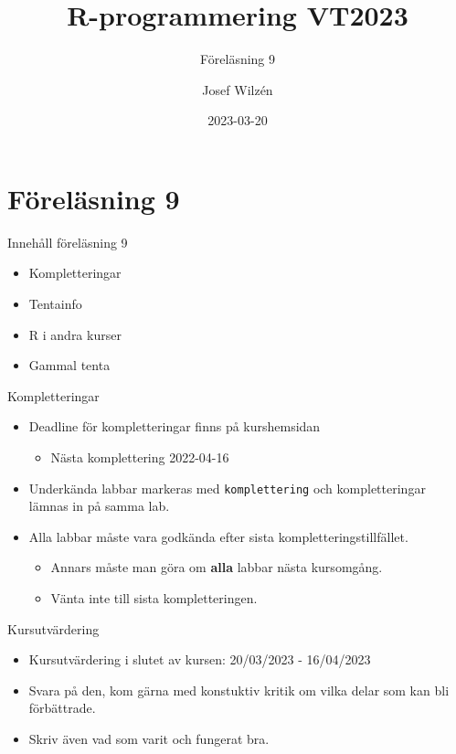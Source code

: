 \documentclass[
  11pt,
  ignorenonframetext,
  handout]{beamer}
\title{R-programmering VT2023}
\subtitle{Föreläsning 9}
\author{Josef Wilzén}
\date{2023-03-20}
\institute{Linköpings Universitet}
\providecommand{\tightlist}{%
  \setlength{\itemsep}{0pt}\setlength{\parskip}{0pt}}
\begin{document}
\frame{\titlepage}

\hypertarget{fuxf6reluxe4sning-9}{%
\section{Föreläsning 9}\label{fuxf6reluxe4sning-9}}


\begin{frame}{Innehåll föreläsning 9}
\protect\hypertarget{innehuxe5ll-fuxf6reluxe4sning-9}{}
\begin{itemize}
\tightlist
\item
  Kompletteringar
\item
  Tentainfo
\item
  R i andra kurser
\item
  Gammal tenta
\end{itemize}
\end{frame}


\begin{frame}[fragile]{Kompletteringar}
\protect\hypertarget{kompletteringar}{}
\begin{itemize}
\tightlist
\item
  Deadline för kompletteringar finns på kurshemsidan 

  \begin{itemize}
  \tightlist
  \item
    Nästa komplettering 2022-04-16
  \end{itemize}
\item
  Underkända labbar markeras med \texttt{komplettering} och
  kompletteringar lämnas in på samma lab.
\item
  Alla labbar måste vara godkända efter sista kompletteringstillfället.

  \begin{itemize}
  \tightlist
  \item
    Annars måste man göra om \textbf{alla} labbar nästa kursomgång.
  \item
    Vänta inte till sista kompletteringen.
  \end{itemize}
\end{itemize}
\end{frame}


\begin{frame}{Kursutvärdering}
\protect\hypertarget{kursutvuxe4rdering}{}
\begin{itemize}
\tightlist
\item
  Kursutvärdering i slutet av kursen: 20/03/2023 - 16/04/2023 
\item
  Svara på den, kom gärna med konstuktiv kritik om vilka delar som kan bli
  förbättrade.
\item
  Skriv även vad som varit och fungerat bra.
\end{itemize}
\end{frame}
\end{document}
